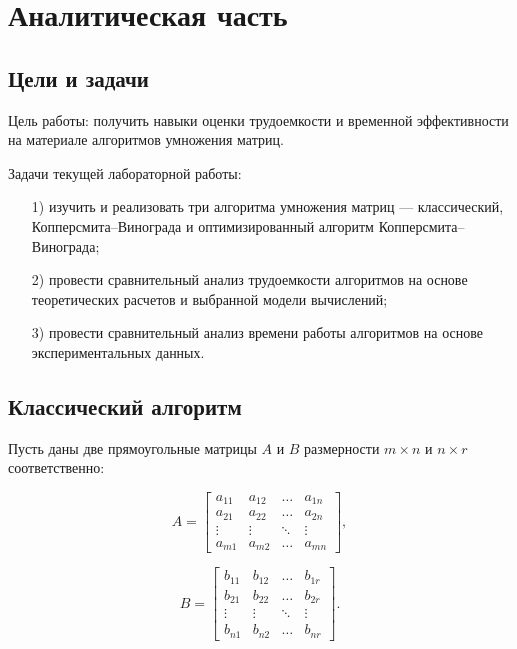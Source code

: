 \chapter{Аналитическая часть}

\section{Цели и задачи}

Цель работы: получить навыки оценки трудоемкости и временной эффективности на материале алгоритмов умножения матриц.

Задачи текущей лабораторной работы:

\begin{enumerate}
\item[1)]
изучить и реализовать три алгоритма умножения матриц --- классический, Копперсмита--Винограда и оптимизированный алгоритм Копперсмита--Винограда;
\item[2)]
провести сравнительный анализ трудоемкости алгоритмов на основе теоретических расчетов и выбранной модели вычислений;
\item[3)]
провести сравнительный анализ времени работы алгоритмов на основе экспериментальных данных.
\end{enumerate}

\section{Классический алгоритм}

Пусть даны две прямоугольные матрицы $A$ и $B$ размерности $m \times n$ и $n \times r$ соответственно:

\begin{equation}
A = \begin{bmatrix}
a_{11} & a_{12} & \hdots & a_{1n} \\
a_{21} & a_{22} & \hdots & a_{2n} \\
\vdots & \vdots & \ddots & \vdots \\
a_{m1} & a_{m2} & \hdots & a_{mn}
\end{bmatrix},
\end{equation}

\begin{equation}
B = \begin{bmatrix}
b_{11} & b_{12} & \hdots & b_{1r} \\
b_{21} & b_{22} & \hdots & b_{2r} \\
\vdots & \vdots & \ddots & \vdots \\
b_{n1} & b_{n2} & \hdots & b_{nr}
\end{bmatrix}.
\end{equation}


